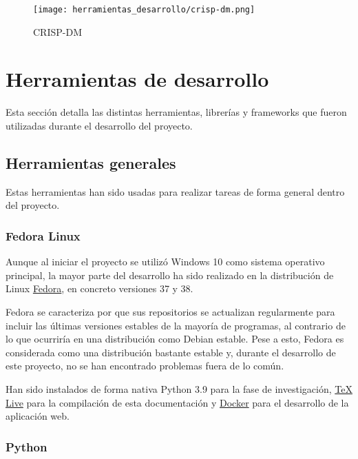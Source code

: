 \begin{figure}[!h]
      \centering
      \texttt{[image: herramientas\_desarrollo/crisp-dm.png]}
      \caption[CRISP-DM]{CRISP-DM \cite{wirth2000crisp}}\label{fig:herramientas_desarrollo/crisp-dm.png}
      \end{figure}
\FloatBarrier

\section{Herramientas de desarrollo}

Esta sección detalla las distintas herramientas, librerías y frameworks que
fueron utilizadas durante el desarrollo del proyecto.

\subsection{Herramientas generales}

Estas herramientas han sido usadas para realizar tareas de forma general dentro
del proyecto.

\subsubsection{Fedora Linux}

Aunque al iniciar el proyecto se utilizó Windows 10 como sistema operativo
principal, la mayor parte del desarrollo ha sido realizado en la distribución de
Linux \href{https://fedoraproject.org/}{Fedora}, en concreto versiones 37 y 38.

Fedora se caracteriza por que sus repositorios se actualizan regularmente para
incluir las últimas versiones estables de la mayoría de programas, al contrario
de lo que ocurriría en una distribución como Debian estable. Pese a esto, Fedora
es considerada como una distribución bastante estable y, durante el desarrollo
de este proyecto, no se han encontrado problemas fuera de lo común.

Han sido instalados de forma nativa Python 3.9 para la fase de investigación,
\href{https://www.tug.org/texlive/}{\TeX{} Live} para la compilación de esta
documentación y \href{https://www.docker.com/}{Docker} para el desarrollo de la
aplicación web.

\subsubsection{Python}

